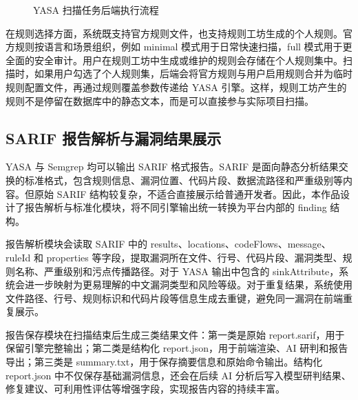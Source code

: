 \documentclass[a4paper,12pt,UTF8]{ctexart}
\numberwithin{figure}{section}
\numberwithin{table}{section}
\numberwithin{equation}{section}
\begin{document}
\begin{figure}[htbp]
\centering
{}
\caption{YASA 扫描任务后端执行流程}
\label{fig:yasa-scan-flow}
\end{figure}

{\songti
在规则选择方面，系统既支持官方规则文件，也支持规则工坊生成的个人规则。官方规则按语言和场景组织，例如 minimal 模式用于日常快速扫描，full 模式用于更全面的安全审计。用户在规则工坊中生成或维护的规则会存储在个人规则集中。扫描时，如果用户勾选了个人规则集，后端会将官方规则与用户启用规则合并为临时规则配置文件，再通过规则覆盖参数传递给 YASA 引擎。这样，规则工坊产生的规则不是停留在数据库中的静态文本，而是可以直接参与实际项目扫描。
\par}

\subsection{SARIF 报告解析与漏洞结果展示}

{\songti
YASA 与 Semgrep 均可以输出 SARIF 格式报告。SARIF 是面向静态分析结果交换的标准格式，包含规则信息、漏洞位置、代码片段、数据流路径和严重级别等内容。但原始 SARIF 结构较复杂，不适合直接展示给普通开发者。因此，本作品设计了报告解析与标准化模块，将不同引擎输出统一转换为平台内部的 finding 结构。

报告解析模块会读取 SARIF 中的 results、locations、codeFlows、message、ruleId 和 properties 等字段，提取漏洞所在文件、行号、代码片段、漏洞类型、规则名称、严重级别和污点传播路径。对于 YASA 输出中包含的 sinkAttribute，系统会进一步映射为更易理解的中文漏洞类型和风险等级。对于重复结果，系统使用文件路径、行号、规则标识和代码片段等信息生成去重键，避免同一漏洞在前端重复展示。

报告保存模块在扫描结束后生成三类结果文件：第一类是原始 report.sarif，用于保留引擎完整输出；第二类是结构化 report.json，用于前端渲染、AI 研判和报告导出；第三类是 summary.txt，用于保存摘要信息和原始命令输出。结构化 report.json 中不仅保存基础漏洞信息，还会在后续 AI 分析后写入模型研判结果、修复建议、可利用性评估等增强字段，实现报告内容的持续丰富。
\par}
\end{document}
